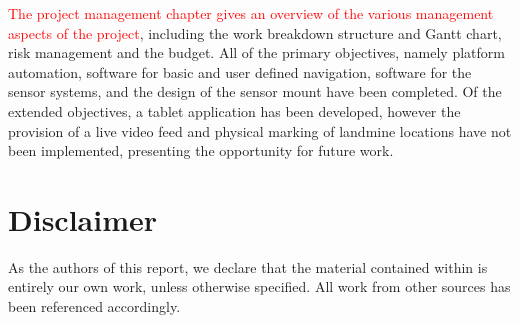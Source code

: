 \documentclass[main.tex]{subfiles}
\begin{document}
\textcolor{red}{The project management chapter gives an overview of the various management aspects of the project}, including the work breakdown structure and Gantt chart, risk management and the budget. 
All of the primary objectives, namely platform automation,  software for basic and user defined navigation, software for the sensor systems, and the design of the sensor mount have been completed. Of the extended objectives, a tablet application has been developed, however the provision of a live video feed and physical marking of landmine locations have not been implemented, presenting the opportunity for future work. 

\newpage
{}
{}	%
\chapter*{Disclaimer}
As the authors of this report, we declare that the material contained within is entirely our own work, unless otherwise specified. All work from other sources has been referenced accordingly. 
\vspace{0.4in}

\end{document}
